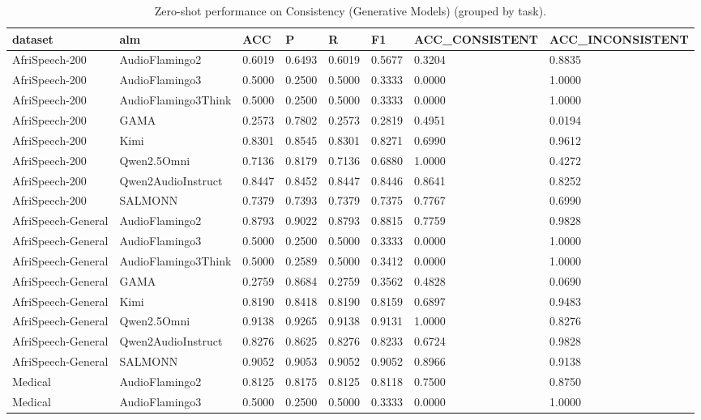 \begin{table}
\caption{Zero-shot performance on Consistency (Generative Models) (grouped by task).}
\label{tab:consistency_generative_models_results}
\begin{tabular}{llllllll}
\toprule
dataset & alm & ACC & P & R & F1 & ACC\_CONSISTENT & ACC\_INCONSISTENT \\
\midrule
AfriSpeech-200 & AudioFlamingo2 & 0.6019 & 0.6493 & 0.6019 & 0.5677 & 0.3204 & 0.8835 \\
AfriSpeech-200 & AudioFlamingo3 & 0.5000 & 0.2500 & 0.5000 & 0.3333 & 0.0000 & 1.0000 \\
AfriSpeech-200 & AudioFlamingo3Think & 0.5000 & 0.2500 & 0.5000 & 0.3333 & 0.0000 & 1.0000 \\
AfriSpeech-200 & GAMA & 0.2573 & 0.7802 & 0.2573 & 0.2819 & 0.4951 & 0.0194 \\
AfriSpeech-200 & Kimi & 0.8301 & 0.8545 & 0.8301 & 0.8271 & 0.6990 & 0.9612 \\
AfriSpeech-200 & Qwen2.5Omni & 0.7136 & 0.8179 & 0.7136 & 0.6880 & 1.0000 & 0.4272 \\
AfriSpeech-200 & Qwen2AudioInstruct & 0.8447 & 0.8452 & 0.8447 & 0.8446 & 0.8641 & 0.8252 \\
AfriSpeech-200 & SALMONN & 0.7379 & 0.7393 & 0.7379 & 0.7375 & 0.7767 & 0.6990 \\
AfriSpeech-General & AudioFlamingo2 & 0.8793 & 0.9022 & 0.8793 & 0.8815 & 0.7759 & 0.9828 \\
AfriSpeech-General & AudioFlamingo3 & 0.5000 & 0.2500 & 0.5000 & 0.3333 & 0.0000 & 1.0000 \\
AfriSpeech-General & AudioFlamingo3Think & 0.5000 & 0.2589 & 0.5000 & 0.3412 & 0.0000 & 1.0000 \\
AfriSpeech-General & GAMA & 0.2759 & 0.8684 & 0.2759 & 0.3562 & 0.4828 & 0.0690 \\
AfriSpeech-General & Kimi & 0.8190 & 0.8418 & 0.8190 & 0.8159 & 0.6897 & 0.9483 \\
AfriSpeech-General & Qwen2.5Omni & 0.9138 & 0.9265 & 0.9138 & 0.9131 & 1.0000 & 0.8276 \\
AfriSpeech-General & Qwen2AudioInstruct & 0.8276 & 0.8625 & 0.8276 & 0.8233 & 0.6724 & 0.9828 \\
AfriSpeech-General & SALMONN & 0.9052 & 0.9053 & 0.9052 & 0.9052 & 0.8966 & 0.9138 \\
Medical & AudioFlamingo2 & 0.8125 & 0.8175 & 0.8125 & 0.8118 & 0.7500 & 0.8750 \\
Medical & AudioFlamingo3 & 0.5000 & 0.2500 & 0.5000 & 0.3333 & 0.0000 & 1.0000 \\

\end{tabular}
\end{table}

